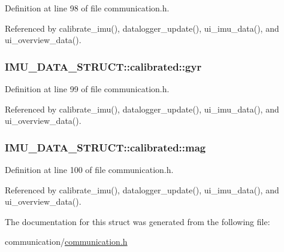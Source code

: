 Definition at line 98 of file communication.h.



Referenced by calibrate\_\-imu(), datalogger\_\-update(), ui\_\-imu\_\-data(), and ui\_\-overview\_\-data().

\hypertarget{structIMU__DATA__STRUCT_1_1calibrated_a8a54aded6ce608f1b7d2b4a0c52c248b}{
\subsubsection[{gyr}]{ {\bf IMU\_\-DATA\_\-STRUCT::calibrated::gyr}}}
\label{structIMU__DATA__STRUCT_1_1calibrated_a8a54aded6ce608f1b7d2b4a0c52c248b}


Definition at line 99 of file communication.h.



Referenced by calibrate\_\-imu(), datalogger\_\-update(), ui\_\-imu\_\-data(), and ui\_\-overview\_\-data().

\hypertarget{structIMU__DATA__STRUCT_1_1calibrated_a2fde6c6759e0fda17e272c32096cb9ec}{
\subsubsection[{mag}]{ {\bf IMU\_\-DATA\_\-STRUCT::calibrated::mag}}}
\label{structIMU__DATA__STRUCT_1_1calibrated_a2fde6c6759e0fda17e272c32096cb9ec}


Definition at line 100 of file communication.h.



Referenced by calibrate\_\-imu(), datalogger\_\-update(), ui\_\-imu\_\-data(), and ui\_\-overview\_\-data().



The documentation for this struct was generated from the following file:\begin{DoxyCompactItemize}
\item 
communication/\hyperlink{communication_8h}{communication.h}\end{DoxyCompactItemize}
